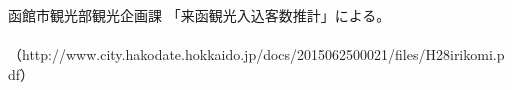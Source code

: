 \documentclass[12pt,papersize]{jsbook}
\begin{document}
\begin{appendix}
\end{appendix}



\begin{thebibliography}{9}
 函館市観光部観光企画課 「来函観光入込客数推計」による。
　　（http://www.city.hakodate.hokkaido.jp/docs/2015062500021/files/H28irikomi.pdf）
\end{thebibliography}
\end{document}
